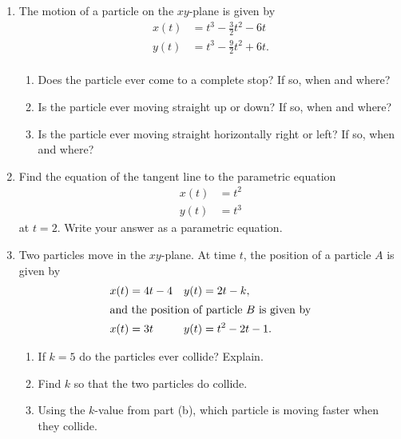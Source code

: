 \documentclass[11pt]{article}
\begin{document}
\drawtitle

\begin{enumerate}
\item The motion of a particle on the $xy$-plane is given by
  \begin{align*}
    x(t) &= t^3 - \frac{3}{2}t^2 - 6t\\
    y(t) &= t^3 - \frac{9}{2}t^2 + 6t.\\
  \end{align*}

  \begin{enumerate}
  \item Does the particle ever come to a complete stop?  If so, when
    and where?
    \vfill
  \item Is the particle ever moving straight up or down?  If so, when
    and where?
    \vfill

    \newpage
    
  \item Is the particle ever moving straight horizontally right or
    left?  If so, when and where?
    \vfill
  \end{enumerate}

\item Find the equation of the tangent line to the parametric equation
  \begin{align*}
    x(t) &= t^2\\
    y(t) &= t^3
  \end{align*}
  at $t = 2$. Write your answer as a parametric equation.
  \vfill
  \newpage
  
\item Two particles move in the $xy$-plane.  At time $t$, the position
  of a particle $A$ is given by
  \begin{align*}
    x(t) &= 4t-4 & y(t) &= 2t-k,\\
    \intertext{and the position of particle $B$ is given by}
    x(t) &= 3t & y(t) &= t^2-2t-1.
  \end{align*}

  \begin{enumerate}
  \item If $k=5$ do the particles ever collide?  Explain.
    \vfill
  \item Find $k$ so that the two particles do collide.
    \vfill

    \newpage
    
  \item Using the $k$-value from part (b), which particle is moving
    faster when they collide.
    \vfill
  \end{enumerate}


\end{enumerate}
\end{document}
